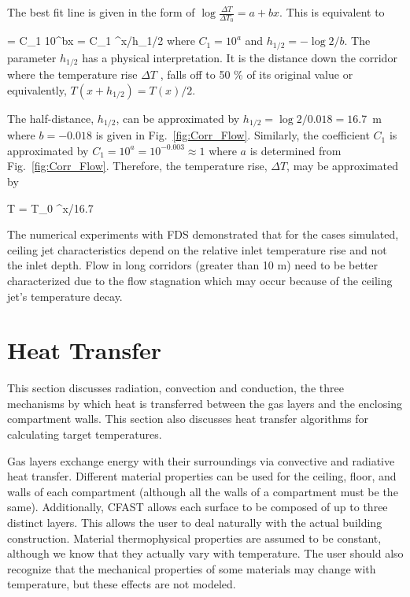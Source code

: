 The best fit line is given in the form of $\log{\frac{\Delta T}{\Delta T_0}} = a + bx$. This is equivalent to

\be {} = C_1 10^{bx}  = C_1 ^{x/h_{1/2}} \ee
where $C_1 = 10^a$ and $h_{1/2} = - \log{2}/b$. The parameter $h_{1/2}$ has a physical interpretation.  It is the distance down the corridor where the temperature rise $\Delta T$ , falls off to 50 \% of its original value or equivalently, $T(x + h_{1/2}) = T (x)/2$.

The half-distance, $h_{1/2}$, can be approximated by $h_{1/2} = \log{2}/0.018 = 16.7$~m where $b = -0.018$ is given in Fig.~\ref{fig:Corr_Flow}. Similarly, the coefficient $C_1$ is approximated by $C_1 = 10^a = 10^{-0.003} \approx 1$ where $a$ is determined from Fig.~\ref{fig:Corr_Flow}. Therefore, the temperature rise, $\Delta T$, may be approximated by

\be \Delta T = \Delta T_0 ^{x/16.7} \ee

The numerical experiments with FDS  demonstrated that for the cases simulated, ceiling jet characteristics depend on the relative inlet temperature rise and not the inlet depth.  Flow in long corridors (greater than 10 m) need to be better characterized due to the flow stagnation which may occur because of the ceiling jet's temperature decay.

\section{Heat Transfer}

This section discusses radiation, convection and conduction, the three mechanisms by which heat is transferred between the gas layers and the enclosing compartment walls.  This section also discusses heat transfer algorithms for calculating target temperatures.

Gas layers exchange energy with their surroundings via convective and radiative heat transfer.  Different material properties can be used for the ceiling, floor, and walls of each compartment (although all the walls of a compartment must be the same).  Additionally, CFAST allows each surface to be composed of up to three distinct layers.  This allows the user to deal naturally with the actual building construction.  Material thermophysical properties are assumed to be constant, although we know that they actually vary with temperature. The user should also recognize that the mechanical properties of some materials may change with temperature, but these effects are not modeled.						

